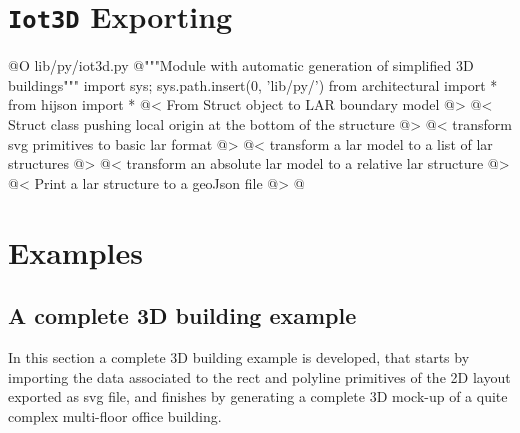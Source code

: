 \documentclass[11pt,oneside]{article}    %
\begin{document}
\section{\texttt{Iot3D} Exporting}

@O lib/py/iot3d.py
@{"""Module with automatic generation of simplified 3D buildings"""
import sys; sys.path.insert(0, 'lib/py/')
from architectural import *
from hijson import *
@< From Struct object to LAR boundary model @>
@< Struct class pushing local origin at the bottom of the structure @>
@< transform svg primitives to basic lar format @>
@< transform a lar model to a list of lar structures @>
@< transform an absolute lar model to a relative lar structure @>
@< Print a lar structure to a geoJson file @>
@}


\section{Examples}

\subsection{A complete 3D building example}

In this section a complete 3D building example is developed, that starts by importing the data associated to the rect and polyline primitives of the 2D layout exported as svg file, and finishes by generating a complete 3D mock-up of a quite complex multi-floor office building.
\end{document}
